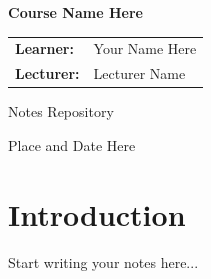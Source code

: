 \documentclass{article}
\newcommand{\coursename}{Course Name Here}
\newcommand{\learner}{Your Name Here}
\newcommand{\lecturer}{Lecturer Name}
\begin{document}
\begin{titlepage}
  \centering
  \vspace*{3cm}
  
  {\Huge \bfseries \coursename \par}
  \vspace{2cm}
  
  \begin{tabular}{>{\bfseries}l l}
    Learner:  & \learner  \\
    Lecturer: & \lecturer \\
  \end{tabular}
  
  \vfill
  {\large Notes Repository}
  \vspace*{2cm}
  
  {\footnotesize Place and Date Here}
\end{titlepage}

\tableofcontents
\newpage

\section{Introduction}
Start writing your notes here...
\end{document}
